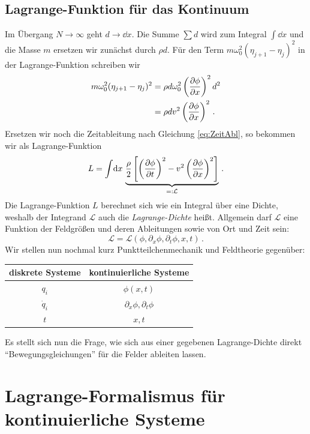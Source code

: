 \documentclass[paper=a4, fontsize=11.0pt, abstractoff, DIV12]{scrartcl}
\newcommand{\LD}{\ensuremath{\mathcal{L}}}
\begin{document}
\subsection{Lagrange-Funktion für das Kontinuum}

Im Übergang $N\to\infty$ geht $d\to \dd x$. Die Summe $\sum d$ wird zum
Integral $\int\!\dd x$ und die Masse $m$ ersetzen wir zunächst durch $\rho d$.
Für den Term $m\omega_0^2 (\eta_{j+1}-\eta_j)^2$ in der Lagrange-Funktion
schreiben wir
\begin{align}
m\omega_0^2 (\eta_{j+1}-\eta_j)^2 &= \rho d \omega_0^2\left(\frac{\partial \phi}{\partial x}\right)^2d^2\nonumber\\
&= \rho d v^2 \left(\frac{\partial \phi}{\partial x}\right)^2\,.
\end{align}
Ersetzen wir noch die Zeitableitung nach Gleichung \eqref{eq:ZeitAbl}, so
bekommen wir als Lagrange-Funktion
\begin{equation}
L = \int\!\dd x\,\underbrace{\frac{\rho}{2}\left[\left(\firstpderiv{\phi}{t}\right)^2 - v^2\left(\firstpderiv{\phi}{x}\right)^2 \right]}_{=:\LD}\,.
\label{eq:LDKette}
\end{equation}
Die Lagrange-Funktion $L$ berechnet sich wie ein Integral über eine Dichte,
weshalb der Integrand $\LD$ auch die \emph{Lagrange-Dichte} heißt. Allgemein
darf $\LD$ eine Funktion der Feldgrößen und deren Ableitungen sowie von Ort
und Zeit sein:
\begin{equation}
\LD = \LD(\phi, \partial_x \phi, \partial_t \phi, x, t)\,.
\end{equation}
Wir stellen nun nochmal kurz Punktteilchenmechanik und Feldtheorie gegenüber:
\begin{center}
\begin{tabular}{c c}
diskrete Systeme & kontinuierliche Systeme\\
\toprule
$q_i$ & $\phi(x,t)$\\
$\dot q_i$ & $\partial_x\phi, \partial_t\phi$\\
$t$ & $x, t$\\
\bottomrule
\end{tabular}
\end{center}
Es stellt sich nun die Frage, wie sich aus einer gegebenen Lagrange-Dichte
direkt ``Bewegungsgleichungen'' für die Felder ableiten lassen.

\section{Lagrange-Formalismus für kontinuierliche Systeme}
\end{document}
